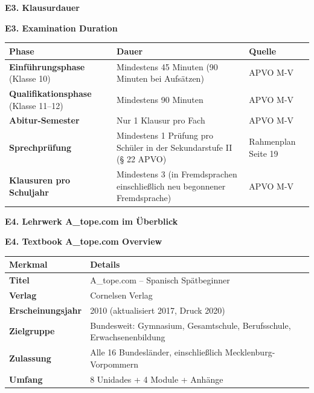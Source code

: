 \documentclass[10pt,a4paper]{article}
\newcommand{\secbil}[2]{%
\vspace{6pt}
\noindent\colorbox{spaet}{\parbox{0.48\textwidth}{\color{white}\bfseries\small #1}}%
\hfill%
\colorbox{english}{\parbox{0.48\textwidth}{\color{white}\bfseries\small #2}}
\vspace{3pt}
}
\begin{document}
\vspace{3mm}

\secbil{E3. Klausurdauer}{E3. Examination Duration}

\vspace{2mm}

\begin{center}
\small
\begin{tabular}{|p{5cm}|p{5cm}|p{4cm}|}
\hline
\rowcolor{lightgray}
\textbf{Phase} & \textbf{Dauer} & \textbf{Quelle} \\
\hline
\textbf{Einführungsphase} (Klasse 10) & Mindestens 45 Minuten (90 Minuten bei Aufsätzen) & APVO M-V \\
\hline
\textbf{Qualifikationsphase} (Klasse 11--12) & Mindestens 90 Minuten & APVO M-V \\
\hline
\textbf{Abitur-Semester} & Nur 1 Klausur pro Fach & APVO M-V \\
\hline
\textbf{Sprechprüfung} & Mindestens 1 Prüfung pro Schüler in der Sekundarstufe II (§ 22 APVO) & Rahmenplan Seite 19 \\
\hline
\textbf{Klausuren pro Schuljahr} & Mindestens 3 (in Fremdsprachen einschließlich neu begonnener Fremdsprache) & APVO M-V \\
\hline
\end{tabular}
\end{center}

\vspace{3mm}

\secbil{E4. Lehrwerk A\_tope.com im Überblick}{E4. Textbook A\_tope.com Overview}

\vspace{2mm}

\begin{center}
\small
\begin{tabular}{|p{4cm}|p{10cm}|}
\hline
\rowcolor{lightgray}
\textbf{Merkmal} & \textbf{Details} \\
\hline
\textbf{Titel} & A\_tope.com -- Spanisch Spätbeginner \\
\hline
\textbf{Verlag} & Cornelsen Verlag \\
\hline
\textbf{Erscheinungsjahr} & 2010 (aktualisiert 2017, Druck 2020) \\
\hline
\textbf{Zielgruppe} & Bundesweit: Gymnasium, Gesamtschule, Berufsschule, Erwachsenenbildung \\
\hline
\textbf{Zulassung} & Alle 16 Bundesländer, einschließlich Mecklenburg-Vorpommern \\
\hline
\textbf{Umfang} & 8 Unidades + 4 Module + Anhänge \\
\hline
\end{tabular}
\end{center}
\end{document}
